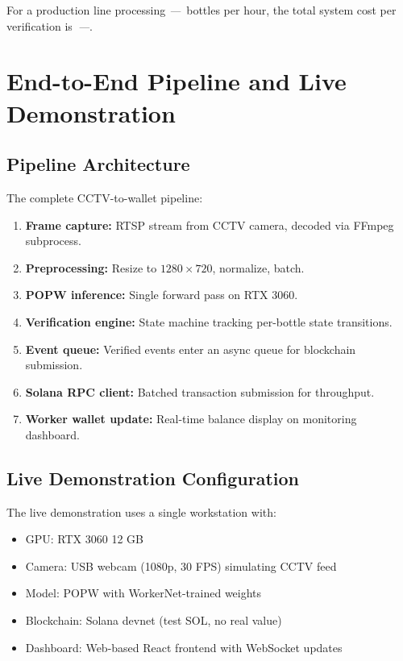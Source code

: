 \documentclass[10pt,twocolumn]{article}
\newcommand{\popw}{POPW}
\newcommand{\todo}{\textit{---}}
\newcommand{\popwres}{\todo}
\begin{document}
For a production line processing \popwres~bottles per hour, the total system cost per verification is~\popwres.

\FloatBarrier

\section{End-to-End Pipeline and Live Demonstration}
\label{sec:demonstration}

\subsection{Pipeline Architecture}

The complete CCTV-to-wallet pipeline:

\begin{enumerate}[nosep]
\item \textbf{Frame capture:} RTSP stream from CCTV camera, decoded via FFmpeg subprocess.
\item \textbf{Preprocessing:} Resize to $1280 \times 720$, normalize, batch.
\item \textbf{\popw{} inference:} Single forward pass on RTX 3060.
\item \textbf{Verification engine:} State machine tracking per-bottle state transitions.
\item \textbf{Event queue:} Verified events enter an async queue for blockchain submission.
\item \textbf{Solana RPC client:} Batched transaction submission for throughput.
\item \textbf{Worker wallet update:} Real-time balance display on monitoring dashboard.
\end{enumerate}

\subsection{Live Demonstration Configuration}

The live demonstration uses a single workstation with:
\begin{itemize}[nosep]
\item GPU: RTX 3060 12 GB
\item Camera: USB webcam (1080p, 30 FPS) simulating CCTV feed
\item Model: \popw{} with WorkerNet-trained weights
\item Blockchain: Solana devnet (test SOL, no real value)
\item Dashboard: Web-based React frontend with WebSocket updates
\end{itemize}
\end{document}
